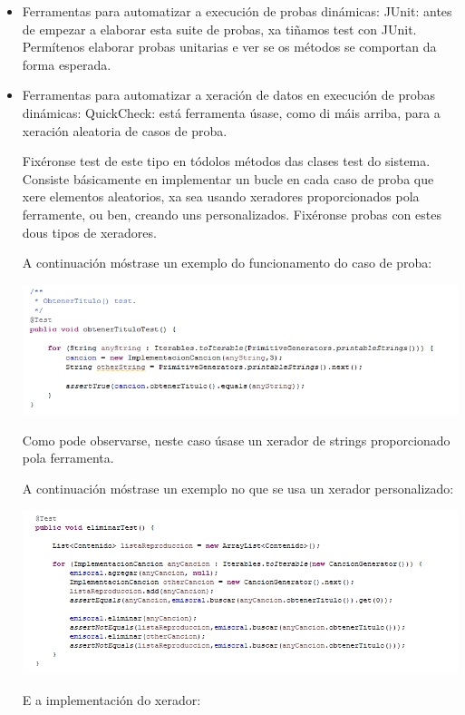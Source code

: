 \documentclass[DIV=calc,paper=a4,fontsize=11pt,onecolumn]{scrartcl}	 %
\begin{document}
  \begin{itemize}
  	\item Ferramentas para automatizar a execución de probas dinámicas:
	  	\subitem JUnit: antes de empezar a elaborar esta suite de probas, xa tiñamos test con JUnit. Permítenos elaborar probas unitarias e ver se os métodos se comportan da forma esperada. 
	  	
  	\item Ferramentas para automatizar a xeración de datos en execución de probas dinámicas:
	  	\subitem QuickCheck: está ferramenta úsase, como di máis arriba, para a xeración aleatoria de casos de proba.
	  	
	  	
	  	Fixéronse test de este tipo en tódolos métodos das clases test do sistema.
	  	Consiste básicamente en implementar un bucle en cada caso de proba que xere elementos aleatorios, xa sea usando xeradores proporcionados pola ferramente, ou ben, creando uns personalizados. Fixéronse probas con estes dous tipos de xeradores.
	  	
	  	
	  	A continuación móstrase un exemplo do funcionamento do caso de proba:
	  	
	  	\includegraphics[width=13cm]{Imagenes/quickcheck1.png}
	  	
	  	
	  	Como pode observarse, neste caso úsase un xerador de strings proporcionado pola ferramenta.
	  	
	  	
	  	A continuación móstrase un exemplo no que se usa un xerador personalizado:
	  	
	  	\includegraphics[width=13cm]{Imagenes/quickcheck2.png}
	  	
	  	
	  	E a implementación do xerador:
	  	

\end{itemize}
\end{document}
